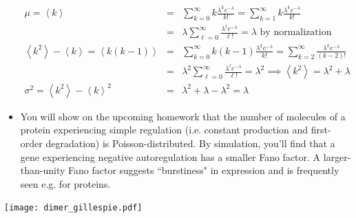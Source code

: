 \documentclass{article}
\begin{document}
\begin{itemize}
\begin{eqnarray*}
\mu = \left< k \right> & = & \sum_{k=0}^{\infty} k \frac{\lambda^k e^{-\lambda}}{k!} = \sum_{k=1}^{\infty} k \frac{\lambda^k e^{-\lambda}}{k!}\\
& = & \lambda \sum_{\ell=0}^{\infty}  \frac{\lambda^{\ell} e^{-\lambda} }{\ell!} = \lambda \textrm{ by normalization}\\
\left< k^2 \right>  - \left< k \right>  = \left< k(k-1) \right> & = & \sum_{k=0}^{\infty} k(k-1) \frac{\lambda^k e^{-\lambda}}{k!} = \sum_{k=2}^{\infty} \frac{\lambda^k e^{-\lambda}}{(k-2)!}\\
& = & \lambda^2 \sum_{\ell=0}^{\infty} \frac{\lambda^{\ell} e^{-\lambda}}{\ell!} = \lambda^2 \implies \left< k^2 \right> = \lambda^2 + \lambda\\
\sigma^2 = \left< k^2 \right> - \left< k \right>^2 & = & \lambda^2 + \lambda - \lambda^2 = \lambda
\end{eqnarray*}
\item You will show on the upcoming homework that the number of molecules of a protein experiencing simple regulation (i.e. constant production and first-order degradation) is Poisson-distributed. By simulation, you'll find that a gene experiencing negative autoregulation has a smaller Fano factor. A larger-than-unity Fano factor suggests ``burstiness" in expression and is frequently seen e.g. for proteins.
\end{itemize}

\begin{center}
\texttt{[image: dimer\_gillespie.pdf]}
\end{center}
\end{document}
